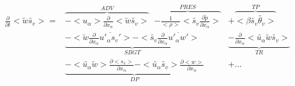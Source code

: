 \begin{displaymath}
\left.
\begin{array}{rllll}
\frac{\partial }{\partial t} <\tilde{w}\tilde{s_v}> = & 
\overbrace{- <u_\alpha>\frac{\partial}{\partial x_\alpha} <\tilde{w}\tilde{s_v}> }^{ADV} \;\;
\overbrace{- \frac{1}{<\rho>}<\tilde{s_v} \frac{\partial \tilde{p}}{\partial x_\alpha}>}^{PRES} &
+\overbrace{<\beta  \tilde{s_v}\tilde{\theta_v}>}^{TP}&\\
&\underbrace{- <\tilde{w}\frac{\partial}{\partial x_\alpha}\overline{u'_\alpha s_v'}>
- <\tilde{s_v}\frac{\partial}{\partial x_\alpha}\overline{u'_\alpha w'}>}_{SBGT} &
 \underbrace{- \frac{\partial}{\partial x_\alpha} <\tilde{u_\alpha} \tilde{w}\tilde{s_v}>}_{TR} & & \\
&\underbrace{- <\tilde{u_\alpha} \tilde{w}> \frac{\partial {<s_v>}}{\partial x_\alpha}
- <\tilde{u_\alpha} \tilde{s_v}> \frac{\partial {<w>}}{\partial x_\alpha}}_{DP}&+\ldots&& \\
\end{array}
\right.
\end{displaymath}

